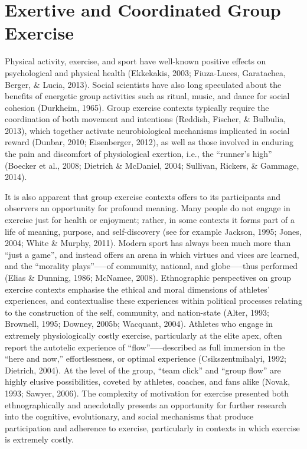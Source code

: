 \section{Exertive and Coordinated Group Exercise}
Physical activity, exercise, and sport have well-known positive effects on psychological and physical health (Ekkekakis, 2003; Fiuza-Luces, Garatachea, Berger, \& Lucia, 2013).
Social scientists have also long speculated about the benefits of energetic group activities such as ritual, music, and dance for social cohesion (Durkheim, 1965).  Group exercise contexts typically require the coordination of both movement and intentions (Reddish, Fischer, \& Bulbulia, 2013), which together activate neurobiological mechanisms implicated in social reward (Dunbar, 2010; Eisenberger, 2012), as well as those involved in enduring the pain and discomfort of physiological exertion, i.e., the ``runner’s high'' (Boecker et al., 2008; Dietrich \& McDaniel, 2004; Sullivan, Rickers, \& Gammage, 2014).


It is also apparent that group exercise contexts offers to its participants and observers an opportunity for profound meaning.  Many people do not engage in exercise just for health or enjoyment; rather, in some contexts it forms part of a life of meaning, purpose, and self-discovery (see for example Jackson, 1995; Jones, 2004; White \& Murphy, 2011). Modern sport has always been much more than ``just a game'', and instead offers an arena in which virtues and vices are learned, and the ``morality plays''—--of community, national, and globe—--thus performed (Elias \& Dunning, 1986; McNamee, 2008).  Ethnographic perspectives on group exercise contexts emphasise the ethical and moral dimensions of athletes’ experiences, and contextualise these experiences within political processes relating to the construction of the self, community, and nation-state (Alter, 1993; Brownell, 1995; Downey, 2005b; Wacquant, 2004).  Athletes who engage in extremely physiologically costly exercise, particularly at the elite apex, often report the autotelic experience of ``flow''—--described as full immersion in the ``here and now,'' effortlessness, or optimal experience (Csikszentmihalyi, 1992; Dietrich, 2004).  At the level of the group, ``team click'' and ``group flow'' are highly elusive possibilities, coveted by athletes, coaches, and fans alike (Novak, 1993; Sawyer, 2006).  The complexity of motivation for exercise presented both ethnographically and anecdotally presents an opportunity for further research into the cognitive, evolutionary, and social mechanisms that produce participation and adherence to exercise, particularly in contexts in which exercise is extremely costly.


